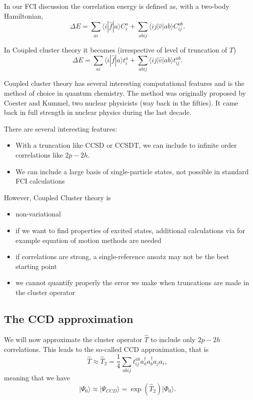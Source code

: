 In our FCI discussion the correlation energy is defined as, with a two-body Hamiltonian,  
\[
\Delta E=\sum_{ai}\langle i| \hat{f}|a \rangle C_{i}^{a}+
\sum_{abij}\langle ij | \hat{v}| ab \rangle C_{ij}^{ab}.
\]

In Coupled cluster theory it becomes (irrespective of level of truncation of $T$)
\[
\Delta E=\sum_{ai}\langle i| \hat{f}|a \rangle t_{i}^{a}+
\sum_{abij}\langle ij | \hat{v}| ab \rangle t_{ij}^{ab}.
\]

Coupled cluster theory has several interesting computational features
and is the method of choice in quantum chemistry. The method was
originally proposed by Coester and Kummel, two nuclear physicists (way
back in the fifties). It came back in full strength in nuclear physics
during the last decade.

There are several interesting features:
\begin{itemize}
\item With a truncation like CCSD or CCSDT, we can include to infinite order correlations like $2p-2h$.

\item We can include a large basis of single-particle states, not possible in standard FCI calculations
\end{itemize}
However, Coupled Cluster theory is
\begin{itemize}
\item non-variational

\item if we want to find properties of excited states, additional calculations via for example equation of motion methods are needed

\item if correlations are strong, a single-reference ansatz may not be the best starting point

\item we cannot quantify properly the error we make when truncations are made in the cluster operator
\end{itemize}

\subsection{The CCD approximation}

We will now approximate the cluster operator $\hat{T}$ to include only
$2p-2h$ correlations. This leads to the so-called CCD approximation,
that is
\[
\hat{T}\approx \hat{T}_2=\frac{1}{4}\sum_{abij}t_{ij}^{ab}a^{\dagger}_aa^{\dagger}_ba_ja_i,
\]
meaning that we have
\[
\vert \Psi_0 \rangle \approx \vert \Psi_{CCD} \rangle = \exp{\left(\hat{T}_2\right)}\vert \Phi_0\rangle.
\]


